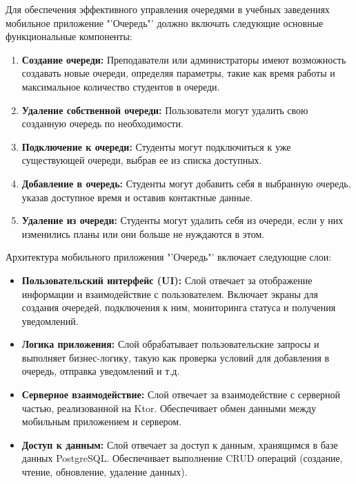 

Для обеспечения эффективного управления очередями в учебных заведениях мобильное приложение "'Очередь"' должно включать следующие основные функциональные компоненты:

\begin{enumerate}
	\item \textbf{Создание очереди:} Преподаватели или администраторы
		имеют возможность создавать новые очереди, определяя параметры,
		такие как время работы и максимальное количество студентов в очереди.
	\item \textbf{Удаление собственной очереди:} Пользователи могут удалить
		свою созданную очередь по необходимости.
	\item \textbf{Подключение к очереди:} Студенты могут подключиться
		к уже существующей очереди, выбрав ее из списка доступных.
	\item \textbf{Добавление в очередь:} Студенты могут добавить себя
		в выбранную очередь, указав доступное время
		и оставив контактные данные.
	\item \textbf{Удаление из очереди:} Студенты могут удалить себя из очереди,
		если у них изменились планы или они больше не нуждаются в этом.
\end{enumerate}


Архитектура мобильного приложения "'Очередь"' включает следующие слои:

\begin{itemize}
    \item \textbf{Пользовательский интерфейс (UI):} Слой отвечает
		за отображение информации и взаимодействие с пользователем.
		Включает экраны для создания очередей, подключения к ним,
		мониторинга статуса и получения уведомлений.
    \item \textbf{Логика приложения:} Слой обрабатывает пользовательские
		запросы и выполняет бизнес-логику, такую как проверка условий
		для добавления в очередь, отправка уведомлений и т.д.
    \item \textbf{Серверное взаимодействие:} Слой отвечает за взаимодействие
		с серверной частью, реализованной на Ktor.
		Обеспечивает обмен данными между мобильным приложением и сервером.
    \item \textbf{Доступ к данным:} Слой отвечает за доступ к данным,
		хранящимся в базе данных PostgreSQL.
		Обеспечивает выполнение CRUD операций
		(создание, чтение, обновление, удаление данных).
\end{itemize}

